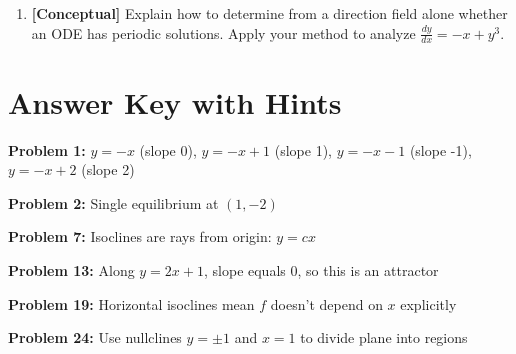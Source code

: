 \documentclass[12pt]{article}
\begin{document}
\begin{enumerate}[resume]
\item \textbf{[Conceptual]} Explain how to determine from a direction field alone whether an ODE has periodic solutions. Apply your method to analyze $\frac{dy}{dx} = -x + y^3$.
\end{enumerate}

\section*{Answer Key with Hints}

\textbf{Problem 1:} $y = -x$ (slope 0), $y = -x + 1$ (slope 1), $y = -x - 1$ (slope -1), $y = -x + 2$ (slope 2)

\textbf{Problem 2:} Single equilibrium at $(1, -2)$

\textbf{Problem 7:} Isoclines are rays from origin: $y = cx$

\textbf{Problem 13:} Along $y = 2x + 1$, slope equals $0$, so this is an attractor

\textbf{Problem 19:} Horizontal isoclines mean $f$ doesn't depend on $x$ explicitly

\textbf{Problem 24:} Use nullclines $y = \pm 1$ and $x = 1$ to divide plane into regions
\end{document}
